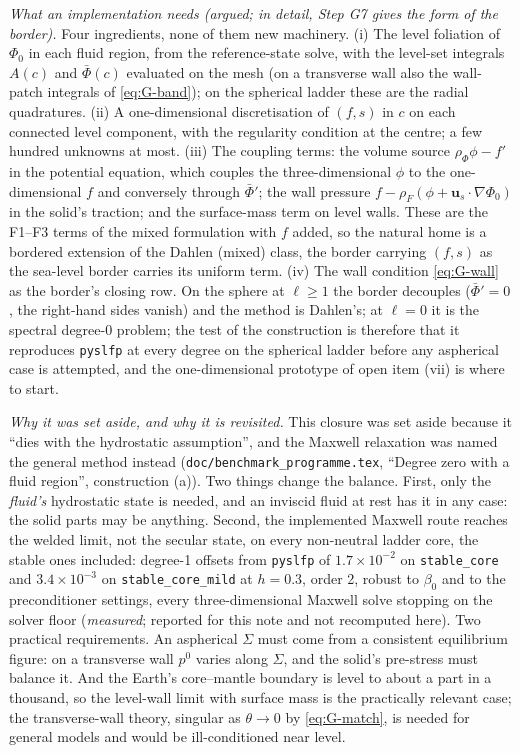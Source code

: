 \documentclass[11pt]{article}
\newcommand{\bu}{\mathbf{u}}
\newcommand{\code}[1]{\texttt{#1}}
\begin{document}
\emph{What an implementation needs (argued; in detail, Step G7 gives
the form of the border).} Four ingredients, none
of them new machinery. (i) The level foliation of $\Phi_0$ in each
fluid region, from the reference-state solve, with the level-set
integrals $A(c)$ and $\bar\Phi(c)$ evaluated on the mesh (on a
transverse wall also the wall-patch integrals of \eqref{eq:G-band});
on the spherical ladder these are the radial quadratures. (ii) A
one-dimensional discretisation of $(f, s)$ in $c$ on each connected
level component, with the regularity condition at the centre; a few
hundred unknowns at most. (iii) The coupling terms: the volume source
$\rho_\Phi\phi - f'$ in the potential equation, which couples the
three-dimensional $\phi$ to the one-dimensional $f$ and conversely
through $\bar\Phi'$; the wall pressure
$f - \rho_F(\phi + \bu_s\cdot\nabla\Phi_0)$ in the solid's traction;
and the surface-mass term on level walls. These are the F1--F3 terms of
the mixed formulation with $f$ added, so the natural home is a bordered
extension of the Dahlen (mixed) class, the border carrying $(f, s)$ as
the sea-level border carries its uniform term. (iv) The wall condition
\eqref{eq:G-wall} as the border's closing row. On the sphere at
$\ell \ge 1$ the border decouples ($\bar\Phi' = 0$, the right-hand
sides vanish) and the method is Dahlen's; at $\ell = 0$ it is the
spectral degree-0 problem; the test of the construction is therefore
that it reproduces \code{pyslfp} at every degree on the spherical ladder
before any aspherical case is attempted, and the one-dimensional
prototype of open item (vii) is where to start.

\emph{Why it was set aside, and why it is revisited.} This closure was
set aside because it ``dies with the hydrostatic assumption'', and the
Maxwell relaxation was named the general method instead
(\code{doc/benchmark\_programme.tex}, ``Degree zero with a fluid
region'', construction (a)). Two things change the balance. First, only the
\emph{fluid's} hydrostatic state is needed, and an inviscid fluid at
rest has it in any case: the solid parts may be anything. Second, the
implemented Maxwell route reaches the welded limit, not the secular
state, on every non-neutral ladder core, the stable ones included:
degree-1 offsets from \code{pyslfp} of $1.7\times10^{-2}$ on
\code{stable\_core} and $3.4\times10^{-3}$ on \code{stable\_core\_mild}
at $h = 0.3$, order 2, robust to $\beta_0$ and to the preconditioner
settings, every three-dimensional Maxwell solve stopping on the solver
floor (\emph{measured}; reported for this note and not recomputed here).
Two practical requirements. An aspherical $\Sigma$ must come from a
consistent equilibrium figure: on a transverse wall $p^0$ varies along
$\Sigma$, and the solid's pre-stress must balance it. And the Earth's
core--mantle boundary is level to about a part in a thousand, so the
level-wall limit with surface mass is the practically relevant case; the
transverse-wall theory, singular as $\theta \to 0$ by \eqref{eq:G-match},
is needed for general models and would be ill-conditioned near level.
\end{document}
